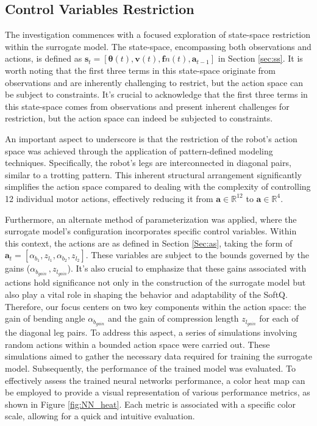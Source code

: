 \subsection{Control Variables Restriction}
The investigation commences with a focused exploration of state-space restriction within the surrogate model. The state-space, encompassing both observations and actions, is defined as $\mathbf{s}_t = [\mathbf{\theta}(t), \mathbf{v}(t), \mathbf{f}n(t), \mathbf{a}_{t-1}]$ in Section \ref{sec:ss}. It is worth noting that the first three terms in this state-space originate from observations and are inherently challenging to restrict, but the action space can be subject to constraints.  It's crucial to acknowledge that the first three terms in this state-space comes from observations and present inherent challenges for restriction, but the action space can indeed be subjected to constraints. 

An important aspect to underscore is that the restriction of the robot's action space was achieved through the application of pattern-defined modeling techniques. Specifically, the robot's legs are interconnected in diagonal pairs, similar to a trotting pattern. This inherent structural arrangement significantly simplifies the action space compared to dealing with the complexity of controlling 12 individual motor actions\cite{jiSynthesizingOptimalGait2022}, effectively reducing it from $\mathbf{a}\in\mathbb{R}^{12}$ to $\mathbf{a}\in\mathbb{R}^4$. 

Furthermore, an alternate method of parameterization was applied, where the surrogate model's configuration incorporates specific control variables. Within this context, the actions are as defined in Section \ref{Sec:as}, taking the form of $\mathbf{a}_{t} = [\alpha_{b_1}, z_{l_1},\alpha_{b_2},z_{l_2}]$. These variables are subject to the bounds governed by the gains ($\alpha_{b_{gain}}\, , z_{l_{gain}}$). It's also crucial to emphasize that these gains associated with actions hold significance not only in the construction of the surrogate model but also play a vital role in shaping the behavior and adaptability of the SoftQ. Therefore, our focus centers on two key components within the action space: the gain of bending angle $\alpha_{b_{gain}}$ and the gain of compression length $z_{l_{gain}}$ for each of the diagonal leg pairs. To address this aspect, a series of simulations involving random actions within a bounded action space were carried out. These simulations aimed to gather the necessary data required for training the surrogate model. Subsequently, the performance of the trained model was evaluated. To effectively assess the trained neural networks performance, a color heat map can be employed to provide a visual representation of various performance metrics, as shown in Figure \ref{fig:NN_heat}. Each metric is associated with a specific color scale, allowing for a quick and intuitive evaluation.

